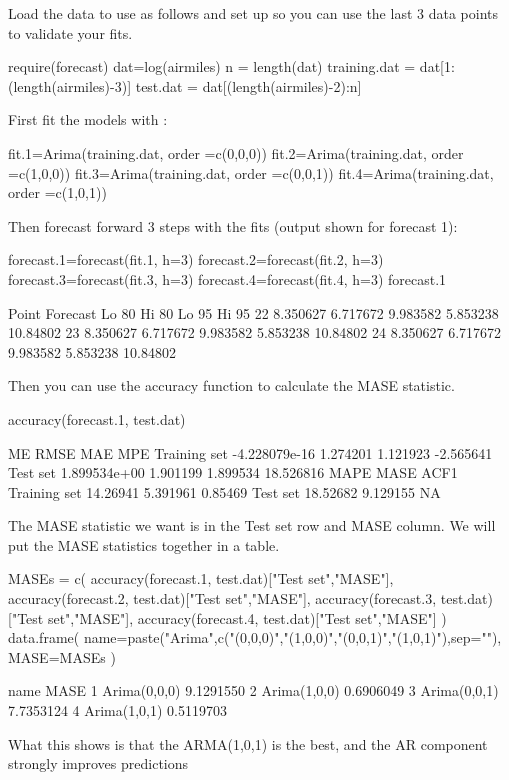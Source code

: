 Load the data to use as follows and set up so you can use the last 3 data points to validate your fits. 
\begin{Schunk}
\begin{Sinput}
 require(forecast)
 dat=log(airmiles)
 n = length(dat)
 training.dat = dat[1:(length(airmiles)-3)]
 test.dat = dat[(length(airmiles)-2):n]
\end{Sinput}
\end{Schunk}

First fit the models with \verb@Arima@:
\begin{Schunk}
\begin{Sinput}
 fit.1=Arima(training.dat, order =c(0,0,0))
 fit.2=Arima(training.dat, order =c(1,0,0))
 fit.3=Arima(training.dat, order =c(0,0,1))
 fit.4=Arima(training.dat, order =c(1,0,1))
\end{Sinput}
\end{Schunk}
Then forecast forward 3 steps with the fits (output shown for forecast 1):
\begin{Schunk}
\begin{Sinput}
 forecast.1=forecast(fit.1, h=3)
 forecast.2=forecast(fit.2, h=3)
 forecast.3=forecast(fit.3, h=3)
 forecast.4=forecast(fit.4, h=3)
 forecast.1
\end{Sinput}
\begin{Soutput}
   Point Forecast    Lo 80    Hi 80    Lo 95    Hi 95
22       8.350627 6.717672 9.983582 5.853238 10.84802
23       8.350627 6.717672 9.983582 5.853238 10.84802
24       8.350627 6.717672 9.983582 5.853238 10.84802
\end{Soutput}
\end{Schunk}
Then you can use the accuracy function to calculate the MASE statistic. 
\begin{Schunk}
\begin{Sinput}
 accuracy(forecast.1, test.dat)
\end{Sinput}
\begin{Soutput}
                        ME     RMSE      MAE       MPE
Training set -4.228079e-16 1.274201 1.121923 -2.565641
Test set      1.899534e+00 1.901199 1.899534 18.526816
                 MAPE     MASE    ACF1
Training set 14.26941 5.391961 0.85469
Test set     18.52682 9.129155      NA
\end{Soutput}
\end{Schunk}
The MASE statistic we want is in the Test set row and MASE column.  We will put the MASE statistics together in a table.
\begin{Schunk}
\begin{Sinput}
 MASEs = c(
   accuracy(forecast.1, test.dat)["Test set","MASE"],
   accuracy(forecast.2, test.dat)["Test set","MASE"],
   accuracy(forecast.3, test.dat)["Test set","MASE"],
   accuracy(forecast.4, test.dat)["Test set","MASE"]
 )
 data.frame(
   name=paste("Arima",c("(0,0,0)","(1,0,0)","(0,0,1)","(1,0,1)"),sep=""), 
   MASE=MASEs
   )
\end{Sinput}
\begin{Soutput}
          name      MASE
1 Arima(0,0,0) 9.1291550
2 Arima(1,0,0) 0.6906049
3 Arima(0,0,1) 7.7353124
4 Arima(1,0,1) 0.5119703
\end{Soutput}
\end{Schunk}
What this shows is that the ARMA(1,0,1) is the best, and the AR component strongly improves predictions


